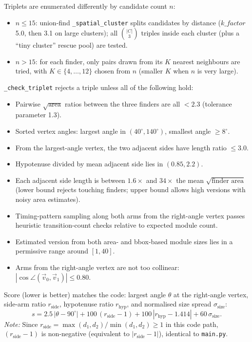 \documentclass[11pt,a4paper]{article}
\begin{document}
Triplets are enumerated differently by candidate count $n$:
\begin{itemize}[leftmargin=1.4em, itemsep=0.2em]
  \item $n \le 15$: union-find \texttt{\_spatial\_cluster} splits candidates
        by distance ($k\_factor$ 5.0, then 3.1 on large clusters); all
        $\binom{|C|}{3}$ triples inside each cluster (plus a ``tiny cluster''
        rescue pool) are tested.
  \item $n > 15$: for each finder, only pairs drawn from its $K$ nearest
        neighbours are tried, with $K \in \{4,\ldots,12\}$ chosen from $n$
        (smaller $K$ when $n$ is very large).
\end{itemize}

\texttt{\_check\_triplet} rejects a triple unless all of the following hold:
\begin{itemize}[leftmargin=1.4em, itemsep=0.2em]
  \item Pairwise $\sqrt{\text{area}}$ ratios between the three finders are
        all $<2.3$ (tolerance parameter 1.3).
  \item Sorted vertex angles: largest angle in $(40^\circ, 140^\circ)$,
        smallest angle $\ge 8^\circ$.
  \item From the largest-angle vertex, the two adjacent sides have length
        ratio $\le 3.0$.
  \item Hypotenuse divided by mean adjacent side lies in $(0.85, 2.2)$.
  \item Each adjacent side length is between $1.6\times$ and $34\times$ the
        mean $\sqrt{\text{finder area}}$ (lower bound rejects touching finders;
        upper bound allows high versions with noisy area estimates).
  \item Timing-pattern sampling along both arms from the right-angle vertex
        passes heuristic transition-count checks relative to expected
        module count.
  \item Estimated version from both area- and bbox-based module sizes lies
        in a permissive range around $[1,40]$.
  \item Arms from the right-angle vertex are not too collinear:
        $|\cos\angle(\vec v_0,\vec v_1)| \le 0.80$.
\end{itemize}

Score (lower is better) matches the code: largest angle $\theta$ at the
right-angle vertex, side-arm ratio $r_{\text{side}}$, hypotenuse ratio
$r_{\text{hyp}}$, and normalised size spread $\sigma_{\text{size}}$:
\[
s =
2.5\,|\theta - 90^\circ|
+ 100\,(r_{\text{side}} - 1)
+ 100\,|r_{\text{hyp}} - 1.414|
+ 60\,\sigma_{\text{size}} .
\]
\textit{Note:} Since $r_{\text{side}}=\max(d_1,d_2)/\min(d_1,d_2)\ge1$ in this code path, $(r_{\text{side}}-1)$ is non-negative (equivalent to $|r_{\text{side}}-1|$), identical to \texttt{main.py}.
\end{document}
